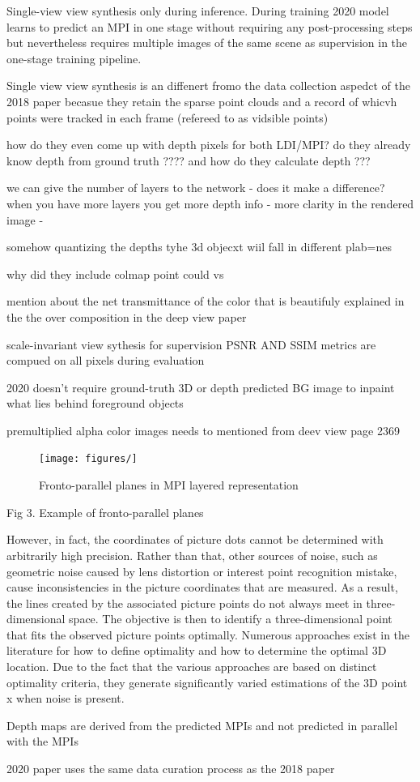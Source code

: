 Single-view view synthesis only during inference. During training 2020 model learns to predict an MPI in one stage without requiring any post-processing steps but nevertheless requires multiple images of the same scene as supervision in the one-stage training pipeline.

Single view view synthesis is an diffenert fromo the data collection aspedct of the 2018 paper becasue they retain the sparse point clouds and a record of whicvh points were tracked in each frame (refereed to as vidsible points)


how do they even come up with depth pixels for both LDI/MPI? do they already know depth from ground truth ????
and how do they calculate depth ???

we can give the number of layers to the network - does it make a difference? 
when you have more layers you get more depth info - more clarity in the rendered image -


somehow quantizing the depths 
tyhe 3d objecxt wiil fall in different plab=nes

why did they include colmap point could vs 

mention about the net transmittance of the color that is beautifuly explained in the the over composition in the deep view paper

scale-invariant view sythesis for supervision
PSNR AND SSIM metrics are compued on all pixels during evaluation

2020 doesn't require ground-truth 3D or depth
predicted BG image to inpaint what lies behind foreground objects

premultiplied alpha color images needs to mentioned from deev view page 2369

\begin{figure}[!h]
    \texttt{[image: figures/]}
    \caption{Fronto-parallel planes in MPI layered representation}
    \label{fig:mpi-layered-representation}
\end{figure}
Fig 3. Example of fronto-parallel planes

However, in fact, the coordinates of picture dots cannot be determined with arbitrarily high precision. Rather than that, other sources of noise, such as geometric noise caused by lens distortion or interest point recognition mistake, cause inconsistencies in the picture coordinates that are measured. As a result, the lines created by the associated picture points do not always meet in three-dimensional space. The objective is then to identify a three-dimensional point that fits the observed picture points optimally. Numerous approaches exist in the literature for how to define optimality and how to determine the optimal 3D location. Due to the fact that the various approaches are based on distinct optimality criteria, they generate significantly varied estimations of the 3D point x when noise is present.

Depth maps are derived from the predicted MPIs and not predicted in parallel with the MPIs

2020 paper uses the same data curation process as the 2018 paper